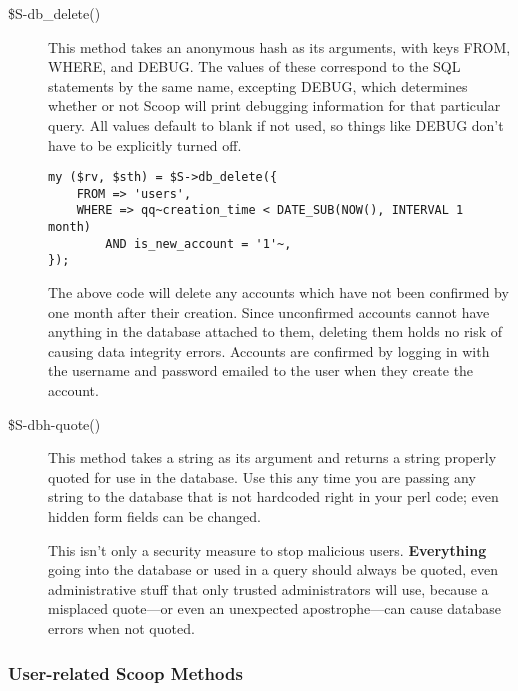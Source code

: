 \begin{description}
\item[\$S-\latexhtml{$>$}{>}db\_delete()] This method takes an anonymous hash as its arguments, with keys FROM, WHERE, and DEBUG. The values of these correspond to the SQL statements by the same name, excepting DEBUG, which determines whether or not Scoop will print debugging information for that particular query. All values default to blank if not used, so things like DEBUG don't have to be explicitly turned off.
\begin{verbatim}
my ($rv, $sth) = $S->db_delete({
	FROM => 'users',
	WHERE => qq~creation_time < DATE_SUB(NOW(), INTERVAL 1 month)
		AND is_new_account = '1'~,
});
\end{verbatim}
The above code will delete any accounts which have not been confirmed by one month after their creation. Since unconfirmed accounts cannot have anything in the database attached to them, deleting them holds no risk of causing data integrity errors. Accounts are confirmed by logging in with the username and password emailed to the user when they create the account.

\item[\$S-\latexhtml{$>$}{>}dbh-\latexhtml{$>$}{>}quote()] This method takes a string as its argument and returns a string properly quoted for use in the database. Use this any time you are passing any string to the database that is not hardcoded right in your perl code; even hidden form fields can be changed. 

This isn't only a security measure to stop malicious users. {\bf Everything} going into the database or used in a query should always be quoted, even administrative stuff that only trusted administrators will use, because a misplaced quote---or even an unexpected apostrophe---can cause database errors when not quoted.

\end{description}

\subsubsection{User-related Scoop Methods}

